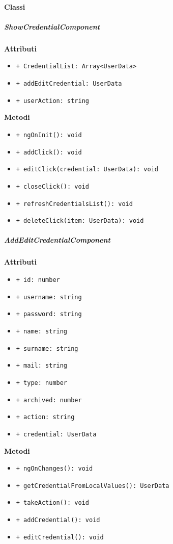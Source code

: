\paragraph{Classi}
\subparagraph{ShowCredentialComponent}
\textbf{Attributi}
\begin{itemize}
	\item \texttt{+ CredentialList: Array<UserData>}
	\item \texttt{+ addEditCredential: UserData}
	\item \texttt{+ userAction: string}
\end{itemize}
\textbf{Metodi}
\begin{itemize}
	\item \texttt{+ ngOnInit(): void}
	\item \texttt{+ addClick(): void}
	\item \texttt{+ editClick(credential: UserData): void}
	\item \texttt{+ closeClick(): void}
	\item \texttt{+ refreshCredentialsList(): void}
	\item \texttt{+ deleteClick(item: UserData): void}
\end{itemize}
\subparagraph{AddEditCredentialComponent}
\textbf{Attributi}
\begin{itemize}
	\item \texttt{+ id: number}
	\item \texttt{+ username: string}
	\item \texttt{+ password: string}
	\item \texttt{+ name: string}
	\item \texttt{+ surname: string}
	\item \texttt{+ mail: string}
	\item \texttt{+ type: number}
	\item \texttt{+ archived: number}
	\item \texttt{+ action: string}
	\item \texttt{+ credential: UserData}
\end{itemize}
\textbf{Metodi}
\begin{itemize}
	\item \texttt{+ ngOnChanges(): void}
	\item \texttt{+ getCredentialFromLocalValues(): UserData}
	\item \texttt{+ takeAction(): void}
	\item \texttt{+ addCredential(): void}
	\item \texttt{+ editCredential(): void}
\end{itemize}

